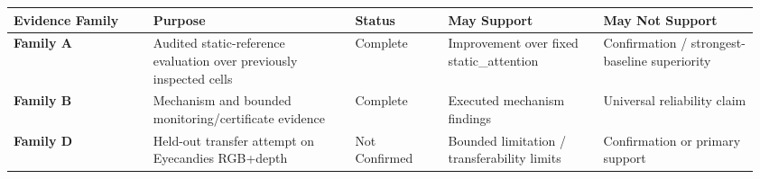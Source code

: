 \begin{tabular}{p{0.18\linewidth}p{0.26\linewidth}p{0.12\linewidth}p{0.20\linewidth}p{0.20\linewidth}}
\toprule
\textbf{Evidence Family} & \textbf{Purpose} & \textbf{Status} & \textbf{May Support} & \textbf{May Not Support} \\
\midrule
\textbf{Family A} & Audited static-reference evaluation over previously inspected cells & Complete & Improvement over fixed static\_attention & Confirmation / strongest-baseline superiority \\
\textbf{Family B} & Mechanism and bounded monitoring/certificate evidence & Complete & Executed mechanism findings & Universal reliability claim \\
\textbf{Family D} & Held-out transfer attempt on Eyecandies RGB+depth & Not Confirmed & Bounded limitation / transferability limits & Confirmation or primary support \\
\bottomrule
\end{tabular}
